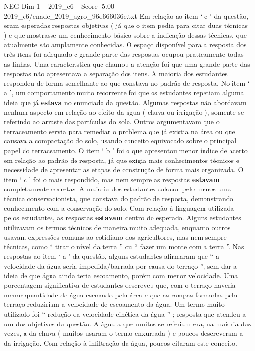 \begin{textsample}{NEG Dim 1 – 2019\_c6 – Score -5.00 – 2019\_c6/enade\_2019\_agro\_96d666036e.txt}
Em relação ao item ‘ c ’ da questão, eram esperadas respostas objetivas ( já que o item pedia para citar duas técnicas ) e que mostrasse um conhecimento básico sobre a indicação dessas técnicas, que atualmente são amplamente conhecidas.
O espaço disponível para a resposta dos três itens foi adequado e grande parte das respostas ocupou praticamente todas as linhas.
Uma característica que chamou a atenção foi que uma grande parte das respostas não apresentava a separação dos itens.
A maioria dos estudantes respondeu de forma semelhante ao que constava no padrão de resposta.
No item ‘ a ’, um comportamento muito recorrente foi que os estudantes repetiam alguma ideia que já \textbf{estava} no enunciado da questão.
Algumas respostas não abordavam nenhum aspecto em relação ao efeito da água ( chuva ou irrigação ), somente se referindo ao arraste das partículas do solo.
Outros argumentavam que o terraceamento servia para remediar o problema que já existia na área ou que causava a compactação do solo, usando conceito equivocado sobre o principal papel do terraceamento.
O item ‘ b ’ foi o que apresentou menor índice de acerto em relação ao padrão de resposta, já que exigia mais conhecimentos técnicos e necessidade de apresentar as etapas de construção de forma mais organizada.
O item ‘ c ’ foi o mais respondido, mas nem sempre as respostas \textbf{estavam} completamente corretas.
A maioria dos estudantes colocou pelo menos uma técnica conservacionista, que constava do padrão de resposta, demonstrando conhecimento com a conservação do solo.
Com relação à linguagem utilizada pelos estudantes, as respostas \textbf{estavam} dentro do esperado.
Alguns estudantes utilizavam os termos técnicos de maneira muito adequada, enquanto outros usavam expressões comuns ao cotidiano dos agricultores, mas nem sempre técnicas, como “ tirar o nível da terra ” ou “ fazer um monte com a terra ”.
Nas respostas ao item ‘ a ’ da questão, alguns estudantes afirmaram que “ a velocidade da água seria impedida/barrada por causa do terraço ”, sem dar a ideia de que água ainda teria escoamento, porém com menor velocidade.
Uma porcentagem significativa de estudantes descreveu que, com o terraço haveria menor quantidade de água escoando pela área e que as rampas formadas pelo terraço reduziriam a velocidade de escoamento da água.
Um termo muito utilizado foi “ redução da velocidade cinética da água ” ; resposta que atendeu a um dos objetivos da questão.
A água a que muitos se referiam era, na maioria das vezes, a da chuva ( muitos usaram o termo enxurrada ) e poucos descreveram a da irrigação.
Com relação à infiltração da água, poucos citaram este conceito.

\end{textsample}
